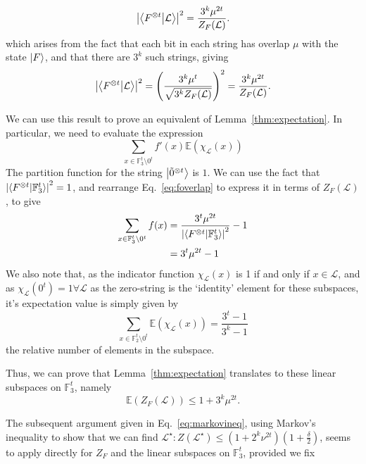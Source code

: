 \documentclass{standalone}
\begin{document}
\begin{equation}\label{eq:foverlap}
\left|\braket{F^{\otimes t}}{\mathcal{L}}\right|^{2}=\frac{3^{k}\mu^{2t}}{Z_{F}(\mathcal{L})}.
\end{equation}
which arises from the fact that each bit in each string has overlap $\mu$ with the state $\ket{F}$, and that there are $3^{k}$ such strings, giving 
\[\left|\braket{F^{\otimes t}}{\mathcal{L}}\right|^{2}=\left(\frac{3^{k}\mu^{t}}{\sqrt{3^{k}Z_{F}(\mathcal{L})}}\right)^{2}=\frac{3^{k}\mu^{2t}}{Z_{F}(\mathcal{L})}.\]
\par
We can use this result to prove an equivalent of Lemma~\ref{thm:expectation}. In particular, we need to evaluate the expression
\[\sum_{x\in\mathbb{F}_{3}^{t}\setminus 0^{t}}f'(x)\mathbb{E}(\chi_{\mathcal{L}}(x))\] 
The partition function for the string $\ket{\tilde{0}^{\otimes t}}$ is $1$. We can use the fact that $\left|\braket{F^{\otimes t}}{\mathbb{F}_{3}^{t}}\right|^{2}=1$, and rearrange Eq.~\ref{eq:foverlap} to express it in terms of $Z_{F}(\mathcal{L})$, to give
\begin{align}
\begin{split}
\sum_{x\in\mathbb{F}_{3}^{t}\setminus 0^{t}}f(x) &= 
\frac{3^{t}\mu^{2t}}{\left|\braket{F^{\otimes t}}{\mathbb{F}_{3}^{t}}\right|^{2}} - 1\\
&= 3^{t}\mu^{2t}-1
\end{split}
\end{align}
We also note that, as the indicator function $\chi_{\mathcal{L}}(x)$ is 1 if and only if $x\in\mathcal{L}$, and as $\chi_{\mathcal{L}}(0^{t})=1\forall\mathcal{L}$ as the zero-string is the `identity' element for these subspaces, it's expectation value is simply given by
\begin{equation}
\sum_{x\in\mathbb{F}_{2}^{t}\setminus 0^{t}}\mathbb{E}\left(\chi_{\mathcal{L}}(x)\right)=\frac{3^{t}-1}{3^{k}-1}
\end{equation}
the relative number of elements in the subspace. 
\par
Thus, we can prove that Lemma~\ref{thm:expectation} translates to these linear subspaces on $\mathbb{F}_{3}^{t}$, namely
\begin{equation}
\mathbb{E}\left( Z_{F}(\mathcal{L}) \right)\leq 1+3^{k}\mu^{2t}.
\end{equation}
\par
The subsequent argument given in Eq.~\ref{eq:markovineq}, using Markov's inequality to show that we can find $\mathcal{L}^{\star}:Z\left(\mathcal{L}^{\star}\right)\leq(1+2^{k}\nu^{2t})\left(1+\frac{\delta}{2}\right)$, seems to apply directly for $Z_{F}$ and the linear subspaces on $\mathbb{F}_{3}^{t}$, provided we fix
\end{document}
